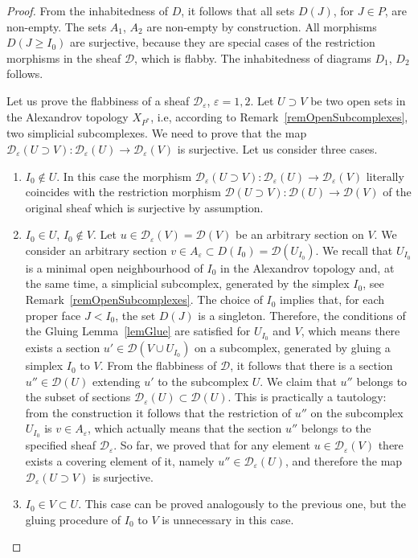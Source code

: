 \documentclass[10pt,a4paper]{amsart}
\newcommand{\ca}[1]{\mathcal{#1}}
\begin{document}
\begin{proof}
From the inhabitedness of $D$, it follows that all sets $D(J)$, for $J\in P$, are non-empty. The sets $A_1$, $A_2$ are non-empty by construction. All morphisms $D(J\geqslant I_0)$ are surjective, because they are special cases of the restriction morphisms in the sheaf $\ca{D}$, which is flabby. The inhabitedness of diagrams $D_1$, $D_2$ follows.

Let us prove the flabbiness of a sheaf $\ca{D}_\varepsilon$, $\varepsilon=1,2$. Let $U\supset V$ be two open sets in the Alexandrov topology $X_{P^*}$, i.e, according to Remark~\ref{remOpenSubcomplexes}, two simplicial subcomplexes. We need to prove that the map $\ca{D}_\varepsilon(U\supset V)\colon \ca{D}_\varepsilon(U)\to \ca{D}_\varepsilon(V)$ is surjective. Let us consider three cases.
\begin{enumerate}
  \item $I_0\notin U$. In this case the morphism $\ca{D}_\varepsilon(U\supset V)\colon \ca{D}_\varepsilon(U)\to \ca{D}_\varepsilon(V)$ literally coincides with the restriction morphism $\ca{D}(U\supset V)\colon \ca{D}(U)\to \ca{D}(V)$ of the original sheaf which is surjective by assumption.
  \item $I_0\in U$, $I_0\notin V$. Let $u\in \ca{D}_\varepsilon(V)=\ca{D}(V)$ be an arbitrary section on $V$. We consider an arbitrary section $v\in A_\varepsilon\subset D(I_0)=\ca{D}(U_{I_0})$. We recall that $U_{I_0}$ is a minimal open neighbourhood of $I_0$ in the Alexandrov topology and, at the same time, a simplicial subcomplex, generated by the simplex $I_0$, see Remark~\ref{remOpenSubcomplexes}. The choice of $I_0$ implies that, for each proper face $J<I_0$, the set $D(J)$ is a singleton. Therefore, the conditions of the Gluing Lemma~\ref{lemGlue} are satisfied for $U_{I_0}$ and $V$, which means there exists a section $u'\in \ca{D}(V\cup U_{I_0})$ on a subcomplex, generated by gluing a simplex $I_0$ to $V$. From the flabbiness of $\ca{D}$, it follows that there is a section $u''\in \ca{D}(U)$ extending $u'$ to the subcomplex $U$. We claim that $u''$ belongs to the subset of sections $\ca{D}_\varepsilon(U)\subset \ca{D}(U)$. This is practically a tautology: from the construction it follows that the restriction of $u''$ on the subcomplex $U_{I_0}$ is $v\in A_\varepsilon$, which actually means that the section $u''$ belongs to the specified sheaf $\ca{D}_\varepsilon$. So far, we proved that for any element $u\in \ca{D}_\varepsilon(V)$ there exists a covering element of it, namely $u''\in\ca{D}_\varepsilon(U)$, and therefore the map $\ca{D}_\varepsilon(U\supset V)$ is surjective.
  \item $I_0\in V\subset U$. This case can be proved analogously to the previous one, but the gluing procedure of $I_0$ to $V$ is unnecessary in this case.
\end{enumerate}
\end{proof}
\end{document}
